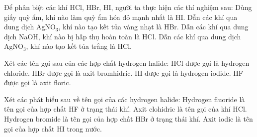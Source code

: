\documentclass[Main.tex]{subfiles}
\begin{document}
    \begin{ex}
    Để phân biệt các khí HCl, HBr, HI, người ta thực hiện các thí nghiệm sau:
    \choiceTF
    {Dùng giấy quỳ ẩm, khí nào làm quỳ ẩm hóa đỏ mạnh nhất là HI.}
    {\True Dẫn các khí qua dung dịch AgNO$_3$, khí nào tạo kết tủa vàng nhạt là HBr.}
    {Dẫn các khí qua dung dịch NaOH, khí nào bị hấp thụ hoàn toàn là HCl.}
    {\True Dẫn các khí qua dung dịch AgNO$_3$, khí nào tạo kết tủa trắng là HCl.}
    \end{ex}
    
    \begin{ex}
    Xét các tên gọi sau của các hợp chất hydrogen halide:
    \choiceTF
    {\True HCl được gọi là hydrogen chloride.}
    {HBr được gọi là axit bromhidric.}
    {\True HI được gọi là hydrogen iodide.}
    {HF được gọi là axit floric.}
    \end{ex}
    
    \begin{ex}
    Xét các phát biểu sau về tên gọi của các hydrogen halide:
    \choiceTF
    {\True Hydrogen fluoride là tên gọi của hợp chất HF ở trạng thái khí.}
    {Axit clohidric là tên gọi của khí HCl.}
    {\True Hydrogen bromide là tên gọi của hợp chất HBr ở trạng thái khí.}
    {Axit iodic là tên gọi của hợp chất HI trong nước.}
    \end{ex}
    
\end{document}
